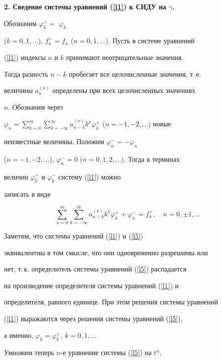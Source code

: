{\bf 2. Сведение системы уравнений (\ref{l1}) к СИДУ на $\gamma$.}


Обозначим $\varphi_k^+=$ $\varphi_k$


($k=0,1,\dotsc$), $f_n^+=f_n$ ($n=0,1,\dotsc$). Пусть в системе уравнений


(\ref{l1}) индексы $n$ и $k$ принимают неотрицательные значения.


Тогда разность $n-k$ пробегает все целочисленные значения, т.\,е.


величины $a_n^{(\nu)}$ определены при всех целочисленных значениях


$n$. Обозначим через


$\varphi_n=\sum\limits_{k=0}^m\sum\limits_{k=-\infty}^{\infty}


a_{n-k}^{(\nu)}k^\nu\varphi_k^+$ ($n=-1,-2,\dotsc$) новые


неизвестные величины. Положим $\varphi_n^-=-\varphi_n$


($n=-1,-2,\dotsc$), $\varphi_n^-=0$ ($n=0,1,2,\dotsc$). Тогда в терминах


величин $\varphi_k^+$ и $\varphi_k^-$ систему (\ref{l1}) можно


записать в виде


\begin{equation}


\label{l5}


\sum_{\nu=0}^m\sum_{k=-\infty}^{\infty}


a_{n-k}^{(\nu)}k^\nu\varphi_k^+ + \varphi_n^-=f_n^+,\quad


n=0,\pm1,\dotsc


\end{equation}


Заметим, что системы уравнений (\ref{l1}) и (\ref{l5})


эквивалентны в том смысле, что они одновременно разрешимы  или


нет, т.\,к. определитель системы уравнений (\ref{l5}) распадается


на произведение определителя системы уравнений (\ref{l1}) и


определителя, равного единице. При этом решения системы уравнений


(\ref{l1}) выражаются через решения системы уравнений (\ref{l5}),


а именно, $\varphi_k=\varphi_k^+$, $k=0,1,\dotsc$





Умножим теперь $n$-е уравнение системы (\ref{l5}) на $t^n$,



